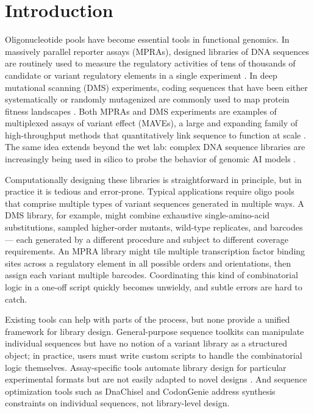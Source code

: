 \documentclass[unnumsec,webpdf,modern,large]{mam-authoring-template}%
\theoremstyle{thmstyleone}%
\theoremstyle{thmstyletwo}%
\theoremstyle{thmstylethree}%
\begin{document}
\maketitle

\section{Introduction}

Oligonucleotide pools have become essential tools in functional genomics. In massively parallel reporter assays (MPRAs), designed libraries of DNA sequences are routinely used to measure the regulatory activities of tens of thousands of candidate or variant regulatory elements in a single experiment \citep{Inoue2015cs}. In deep mutational scanning (DMS) experiments, coding sequences that have been either systematically or randomly mutagenized are commonly used to map protein fitness landscapes \citep{Fowler2014gq}. Both MPRAs and DMS experiments are examples of multiplexed assays of variant effect (MAVEs), a large and expanding family of high-throughput methods that quantitatively link sequence to function at scale \citep{Kinney2019jc}. The same idea extends beyond the wet lab: complex DNA sequence libraries are increasingly being used in silico to probe the behavior of genomic AI models \citep{Avsec2021bpnet, Nagai2026review}.

Computationally designing these libraries is straightforward in principle, but in practice it is tedious and error-prone. Typical applications require oligo pools that comprise multiple types of variant sequences generated in multiple ways. A DMS library, for example, might combine exhaustive single-amino-acid substitutions, sampled higher-order mutants, wild-type replicates, and barcodes — each generated by a different procedure and subject to different coverage requirements. An MPRA library might tile multiple transcription factor binding sites across a regulatory element in all possible orders and orientations, then assign each variant multiple barcodes. Coordinating this kind of combinatorial logic in a one-off script quickly becomes unwieldy, and subtle errors are hard to catch.

Existing tools can help with parts of the process, but none provide a unified framework for library design. General-purpose sequence toolkits \citep{Cock2009df, Schreiber2025nd, Pereira2015wj, Klie2023kg} can manipulate individual sequences but have no notion of a variant library as a structured object; in practice, users must write custom scripts to handle the combinatorial logic themselves. Assay-specific tools automate library design for particular experimental formats but are not easily adapted to novel designs \citep{GeorgakopoulosSoares2017gb, Ghazi2018aa, Barbon2022th}. And sequence optimization tools such as DnaChisel \citep{Zulkower2020jk} and CodonGenie \citep{Swainston2017rb} address synthesis constraints on individual sequences, not library-level design.
\end{document}
